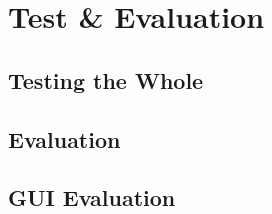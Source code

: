\chapter{Test \& Evaluation}\label{chap:testeval}

\section{Testing the Whole}

\section{Evaluation}

\section{GUI Evaluation}